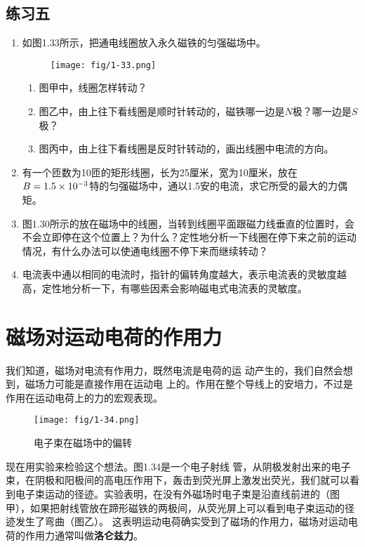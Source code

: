 \subsection*{练习五}
\begin{enumerate}
    \item 如图1.33所示，把通电线圈放入永久磁铁的匀强磁场中。
    \begin{figure}[htp]\centering
    	\texttt{[image: fig/1-33.png]}
    	\caption{ }
    \end{figure}
    \begin{enumerate}
        \item 图甲中，线圈怎样转动？
        \item 图乙中，由上往下看线圈是顺时针转动的，磁铁哪一边是$N$极？哪一边是$S$极？
        \item 图丙中，由上往下看线圈是反时针转动的，画出线圈中电流的方向。
    \end{enumerate}
    \item 有一个匝数为10匝的矩形线圈，长为25厘米，宽为10厘米，放在$B=1.5\times10^{-3}$特的匀强磁场中，通以1.5安的电流，求它所受的最大的力偶矩。
    \item 图1.30所示的放在磁场中的线圈，当转到线圈平面跟磁力线垂直的位置时，会不会立即停在这个位置上？为什么？定性地分析一下线圈在停下来之前的运动情况，有什么办法可以使通电线圈不停下来而继续转动？
    \item 电流表中通以相同的电流时，指针的偏转角度越大，表示电流表的灵敏度越高，定性地分析一下，有哪些因素会影响磁电式电流表的灵敏度。
\end{enumerate}


\section{磁场对运动电荷的作用力}
我们知道，磁场对电流有作用力，既然电流是电荷的运
动产生的，我们自然会想到，磁场力可能是直接作用在运动电
上的。作用在整个导线上的安培力，不过是作用在运动电荷上的力的宏观表现。
\begin{figure}[htp]\centering
	\texttt{[image: fig/1-34.png]}
	\caption{电子束在磁场中的偏转}
\end{figure}

现在用实验来检验这个想法。图1.34是一个电子射线
管，从阴极发射出来的电子束，在阴极和阳极间的高电压作用下，轰击到荧光屏上激发出荧光，我们就可以看到电子束运动的径迹。实验表明，在没有外磁场时电子束是沿直线前进的（图甲），如果把射线管放在蹄形磁铁的两极间，从荧光屏上可以看到电子束运动的径迹发生了弯曲（图乙）。 这表明运动电荷确实受到了磁场的作用力，磁场对运动电荷的作用力通常叫做\textbf{洛仑兹力}。


